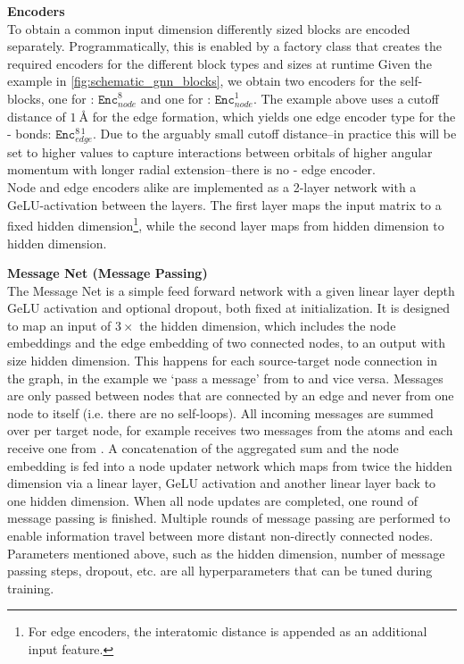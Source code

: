 \textbf{Encoders}\\
To obtain a common input dimension differently sized blocks are encoded separately. Programmatically, this is enabled by a factory class that creates the required encoders for the different block types and sizes at runtime Given the  example in \autoref{fig:schematic_gnn_blocks}, we obtain two encoders for the self-blocks, one for : $\texttt{Enc}^{8}_{node}$ and one for : $\texttt{Enc}^{1}_{node}$. The example above uses a cutoff distance of $\SI{1}{\angstrom}$ for the edge formation, which yields one edge encoder type for the - bonds: $\texttt{Enc}^{8\,1}_{edge}$. Due to the arguably small cutoff distance--in practice this will be set to higher values to capture interactions between orbitals of higher angular momentum with longer radial extension--there is no - edge encoder. \\
Node and edge encoders alike are implemented as a 2-layer network with a GeLU-activation between the layers. The first layer maps the input matrix to a fixed hidden dimension\footnote{For edge encoders, the interatomic distance is appended as an additional input feature.}, while the second layer maps from hidden dimension to hidden dimension. 

\textbf{Message Net (Message Passing)}\\
The Message Net is a simple feed forward network with a given linear layer depth GeLU activation and optional dropout, both fixed at initialization. It is designed to map an input of $3 \times$ the hidden dimension, which includes the node embeddings and the edge embedding of two connected nodes, to an output with size hidden dimension. This happens for each source-target node connection in the graph, in the example we `pass a message' from  to  and vice versa. Messages are only passed between nodes that are connected by an edge and never from one node to itself (i.e. there are no self-loops). All incoming messages are summed over per target node, for  example  receives two messages from the  atoms and each  receive one from . A concatenation of the aggregated sum and the node embedding is fed into a node updater network which maps from twice the hidden dimension via a linear layer, GeLU activation and another linear layer back to one hidden dimension. When all node updates are completed, one round of message passing is finished. Multiple rounds of message passing are performed to enable information travel between more distant non-directly connected nodes.\\
Parameters mentioned above, such as the hidden dimension, number of message passing steps, dropout, etc. are all hyperparameters that can be tuned during training. 

